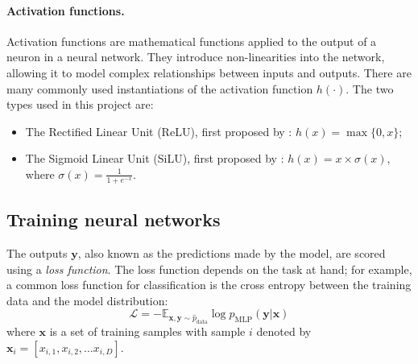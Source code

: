 \paragraph{Activation functions.} Activation functions are mathematical functions applied to the output of a neuron in a neural network. They introduce non-linearities into the network, allowing it to model complex relationships between inputs and outputs.
There are many commonly used instantiations of the activation function $h(\cdot)$. The two types used in this project are:
\begin{itemize}
    \item The Rectified Linear Unit (ReLU), first proposed by \citet{relu}: $h(x)=\max\{0, x\}$;
    \item The Sigmoid Linear Unit (SiLU), first proposed by \citet{gelu}: $h(x) = x\times\sigma(x)$, where $\sigma(x) = \frac{1}{1 + e^{-x}}$. 
\end{itemize}
\subsection{Training neural networks}
The outputs $\mathbf{y}$, also known as the predictions made by the model, are scored using a \textit{loss function}. The loss function depends on the task at hand; for example, a common loss function for classification is the cross entropy between the training data and the model distribution:
\begin{equation}
    \mathcal{L} = -\mathbb{E}_{\mathbf{x}, \mathbf{y}\sim \hat{p}_\text{data}}\log p_{\text{MLP}}(\mathbf{y}|\mathbf{x})
\end{equation}
where $\mathbf{x}$ is a set of training samples with sample $i$ denoted by $\mathbf{x}_i = [x_{i, 1}, x_{i, 2},\dots x_{i, D}]$.

